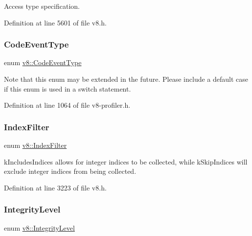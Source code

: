 Access type specification. 

Definition at line 5601 of file v8.\+h.

\mbox{\label{namespacev8_af0ff31131cc32ced9b5279b321569bbc}} 
\subsubsection{\texorpdfstring{Code\+Event\+Type}{CodeEventType}}
{\footnotesize\ttfamily enum \mbox{\hyperlink{namespacev8_af0ff31131cc32ced9b5279b321569bbc}{v8\+::\+Code\+Event\+Type}}}

Note that this enum may be extended in the future. Please include a default case if this enum is used in a switch statement. 

Definition at line 1064 of file v8-\/profiler.\+h.

\mbox{\label{namespacev8_a46fd71fef702b35b34ed7495e7a63323}} 
\subsubsection{\texorpdfstring{Index\+Filter}{IndexFilter}}
{\footnotesize\ttfamily enum \mbox{\hyperlink{namespacev8_a46fd71fef702b35b34ed7495e7a63323}{v8\+::\+Index\+Filter}}\hspace{0.3cm}{\ttfamily [strong]}}

k\+Includes\+Indices allows for integer indices to be collected, while k\+Skip\+Indices will exclude integer indices from being collected. 

Definition at line 3223 of file v8.\+h.

\mbox{\label{namespacev8_a02642d03ff1eecc2fd358626499c2e30}} 
\subsubsection{\texorpdfstring{Integrity\+Level}{IntegrityLevel}}
{\footnotesize\ttfamily enum \mbox{\hyperlink{namespacev8_a02642d03ff1eecc2fd358626499c2e30}{v8\+::\+Integrity\+Level}}\hspace{0.3cm}{\ttfamily [strong]}}


